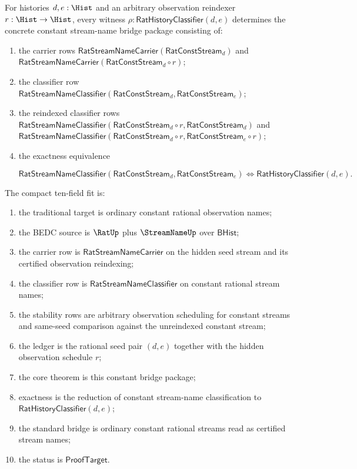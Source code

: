 \begin{theorem}
\label{thm:rat-stream-name-constant-bridge-package}
For histories $d,e:\Hist$ and an arbitrary observation reindexer
$r:\Hist\to\Hist$, every witness
$\rho:\mathsf{RatHistoryClassifier}(d,e)$ determines the concrete constant
stream-name bridge package consisting of:
\begin{enumerate}
  \item the carrier rows
  $\mathsf{RatStreamNameCarrier}(\mathsf{RatConstStream}_d)$ and
  $\mathsf{RatStreamNameCarrier}(\mathsf{RatConstStream}_d\circ r)$;
  \item the classifier row
  $\mathsf{RatStreamNameClassifier}(\mathsf{RatConstStream}_d,
  \mathsf{RatConstStream}_e)$;
  \item the reindexed classifier rows
  $\mathsf{RatStreamNameClassifier}(\mathsf{RatConstStream}_d\circ r,
  \mathsf{RatConstStream}_d)$ and
  $\mathsf{RatStreamNameClassifier}(\mathsf{RatConstStream}_d\circ r,
  \mathsf{RatConstStream}_e\circ r)$;
  \item the exactness equivalence

  $$
  \mathsf{RatStreamNameClassifier}(\mathsf{RatConstStream}_d,
  \mathsf{RatConstStream}_e)
  \Longleftrightarrow
  \mathsf{RatHistoryClassifier}(d,e).
  $$

\end{enumerate}

The compact ten-field fit is:
\begin{enumerate}
  \item the traditional target is ordinary constant rational observation names;
  \item the BEDC source is $\RatUp$ plus $\StreamNameUp$ over $\mathsf{BHist}$;
  \item the carrier row is $\mathsf{RatStreamNameCarrier}$ on the hidden seed
  stream and its certified observation reindexing;
  \item the classifier row is $\mathsf{RatStreamNameClassifier}$ on constant
  rational stream names;
  \item the stability rows are arbitrary observation scheduling for constant
  streams and same-seed comparison against the unreindexed constant stream;
  \item the ledger is the rational seed pair $(d,e)$ together with the hidden
  observation schedule $r$;
  \item the core theorem is this constant bridge package;
  \item exactness is the reduction of constant stream-name classification to
  $\mathsf{RatHistoryClassifier}(d,e)$;
  \item the standard bridge is ordinary constant rational streams read as
  certified stream names;
  \item the status is $\mathsf{ProofTarget}$.
\end{enumerate}
\end{theorem}
